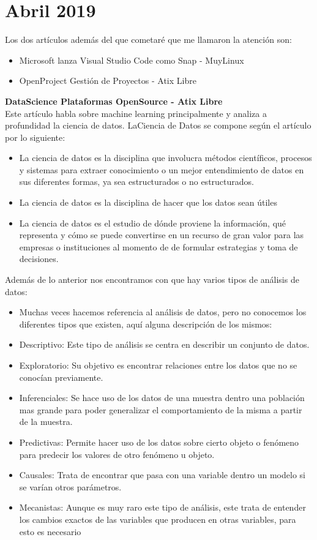 \documentclass[a4paper, 11pt, oneside]{article}
\begin{document}
\section*{Abril 2019}
Los dos artículos además del que cometaré que me llamaron la atención son:
\begin{itemize}
    \item Microsoft lanza Visual Studio Code como Snap - MuyLinux
    \item OpenProject Gestión de Proyectos - Atix Libre
\end{itemize}
\textbf{DataScience Plataformas OpenSource - Atix Libre}\\
Este artículo habla sobre machine learning principalmente y analiza a profundidad la ciencia de datos.
LaCiencia de Datos se compone según el artículo por lo siguiente:
\begin{itemize}
    \item La ciencia de datos es la disciplina que involucra métodos científicos, procesos y
    sistemas para extraer conocimiento o un mejor entendimiento de datos en sus diferentes
    formas, ya sea estructurados o no estructurados.
    \item La ciencia de datos es la disciplina de hacer que los datos sean útiles
    \item La ciencia de datos es el estudio de dónde proviene la información, qué representa y
    cómo se puede convertirse en un recurso de gran valor para las empresas o
    instituciones al momento de de formular estrategias y toma de decisiones.
\end{itemize}
Además de lo anterior nos encontramos con que hay varios tipos de análisis de datos:
\begin{itemize}
    \item Muchas veces hacemos referencia al análisis de datos, pero no conocemos los diferentes tipos
    que existen, aquí alguna descripción de los mismos:
    \item Descriptivo: Este tipo de análisis se centra en describir un conjunto de datos.
    \item Exploratorio: Su objetivo es encontrar relaciones entre los datos que no se conocían
    previamente.
    \item Inferenciales: Se hace uso de los datos de una muestra dentro una población mas
    grande para poder generalizar el comportamiento de la misma a partir de la muestra.
    \item Predictivas: Permite hacer uso de los datos sobre cierto objeto o fenómeno para
    predecir los valores de otro fenómeno u objeto.
    \item Causales: Trata de encontrar que pasa con una variable dentro un modelo si se varían
    otros parámetros.
    \item Mecanistas: Aunque es muy raro este tipo de análisis, este trata de entender los
    cambios exactos de las variables que producen en otras variables, para esto es
    necesario 
\end{itemize}
\end{document}
